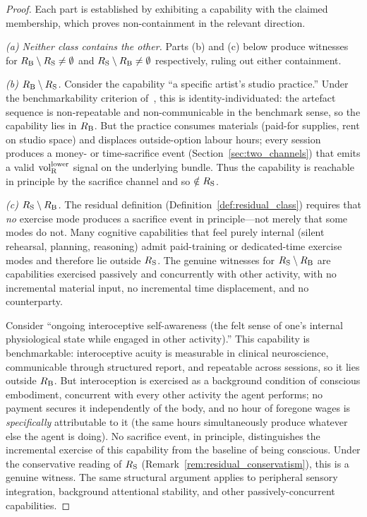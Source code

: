 \begin{proof}
Each part is established by exhibiting a capability with the
claimed membership, which proves non-containment in the relevant
direction.

\emph{(a) Neither class contains the other.}
Parts (b) and (c) below produce witnesses for
$R_{\mathrm{B}} \setminus R_{\mathrm{S}} \neq \emptyset$ and
$R_{\mathrm{S}} \setminus R_{\mathrm{B}} \neq \emptyset$ respectively, ruling out
either containment.

\emph{(b) $R_{\mathrm{B}} \setminus R_{\mathrm{S}}$.}
Consider the capability ``a specific artist's studio practice.''
Under the benchmarkability criterion of~\citep[%
Definition~2]{lasser2026poset}, this is identity-individuated: the
artefact sequence is non-repeatable and non-communicable in the
benchmark sense, so the capability lies in $R_{\mathrm{B}}$.  But the
practice consumes materials (paid-for supplies, rent on studio
space) and displaces outside-option labour hours; every session
produces a money- or time-sacrifice event
(Section~\ref{sec:two_channels}) that emits a valid
${\operatorname{vol}_{\mathrm{R}}^{\mathrm{lower}}}$ signal on the underlying bundle.  Thus the capability
is reachable in principle by the sacrifice channel and so
$\notin R_{\mathrm{S}}$.

\emph{(c) $R_{\mathrm{S}} \setminus R_{\mathrm{B}}$.}
The residual definition (Definition~\ref{def:residual_class})
requires that \emph{no} exercise mode produces a sacrifice event
in principle---not merely that some modes do not.  Many cognitive
capabilities that feel purely internal (silent rehearsal,
planning, reasoning) admit paid-training or dedicated-time
exercise modes and therefore lie outside $R_{\mathrm{S}}$.  The genuine
witnesses for $R_{\mathrm{S}} \setminus R_{\mathrm{B}}$ are capabilities exercised
passively and concurrently with other activity, with no
incremental material input, no incremental time displacement, and
no counterparty.

Consider ``ongoing interoceptive self-awareness (the felt sense
of one's internal physiological state while engaged in other
activity).''  This capability is benchmarkable: interoceptive
acuity is measurable in clinical neuroscience, communicable
through structured report, and repeatable across sessions, so it
lies outside $R_{\mathrm{B}}$.  But interoception is exercised as a
background condition of conscious embodiment, concurrent with
every other activity the agent performs; no payment secures it
independently of the body, and no hour of foregone wages is
\emph{specifically} attributable to it (the same hours
simultaneously produce whatever else the agent is doing).  No
sacrifice event, in principle, distinguishes the incremental
exercise of this capability from the baseline of being
conscious.  Under the conservative reading of $R_{\mathrm{S}}$
(Remark~\ref{rem:residual_conservatism}), this is a genuine
witness.  The same structural argument applies to peripheral
sensory integration, background attentional stability, and other
passively-concurrent capabilities.


\end{proof}
